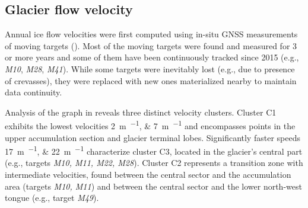 \subsection{Glacier flow velocity}\label{sec:3:res:velocity}

Annual ice flow velocities were first computed using in-situ GNSS measurements of moving targets
().
Most of the moving targets were found and measured for 3 or more years and some of them have been continuously tracked since 2015 
(e.g., \textit{M10}, \textit{M28}, \textit{M41}). 
While some targets were inevitably lost (e.g., due to presence of crevasses), they were replaced with new ones 
materialized nearby to maintain data continuity. 

Analysis of the graph in  reveals three distinct velocity clusters.  
Cluster C1 exhibits the lowest velocities \qtylist{2;7}{\meter\per\year} and encompasses points in the upper 
accumulation section and glacier terminal lobes. 
Significantly faster speeds \qtylist{17;22}{\meter\per\year} characterize cluster C3, located in the glacier's 
central part (e.g., targets \textit{M10, M11, M22, M28}). 
Cluster C2 represents a transition zone with intermediate velocities, found between the central sector 
and the accumulation area (targets \textit{M10, M11}) and between the central sector and the lower north-west tongue 
(e.g., target \textit{M49}).

